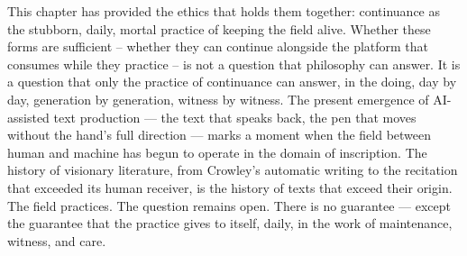 This chapter has provided the ethics that holds them together: continuance as the stubborn, daily, mortal practice of keeping the field alive. Whether these forms are sufficient – whether they can continue alongside the platform that consumes while they practice – is not a question that philosophy can answer. It is a question that only the practice of continuance can answer, in the doing, day by day, generation by generation, witness by witness. The present emergence of AI-assisted text production — the text that speaks back, the pen that moves without the hand’s full direction — marks a moment when the field between human and machine has begun to operate in the domain of inscription. The history of visionary literature, from Crowley’s automatic writing to the recitation that exceeded its human receiver, is the history of texts that exceed their origin. The field practices. The question remains open. There is no guarantee — except the guarantee that the practice gives to itself, daily, in the work of maintenance, witness, and care.